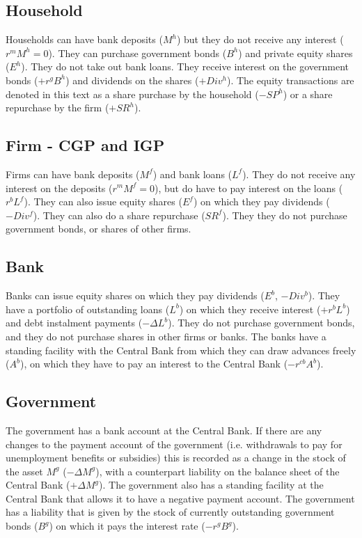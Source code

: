 \subsection{Household}
Households can have bank deposits ($M^h$) but they do not receive any interest ($r^{m} M^h=0$).
They can purchase government bonds ($B^h$) and private equity shares ($E^h$). They do not take out bank loans. They receive interest on the government bonds ($+r^gB^h$) and dividends on the shares ($+Div^h$). The equity transactions are denoted in this text as a share purchase by the household ($-SP^h$) or a share repurchase by the firm ($+SR^h$).

\subsection{Firm - CGP and IGP}
Firms can have bank deposits ($M^f$) and bank loans ($L^f$). They do not receive any interest on the deposits ($r^{m} M^f=0$), but do have to pay interest on the loans ($r^b L^f$). They can also issue equity shares ($E^f$) on which they pay dividends ($-Div^f$). They can also do a share repurchase ($SR^f$). They they do not purchase government bonds, or shares of other firms.

\subsection{Bank}
Banks can issue equity shares on which they pay dividends ($E^b$, $-Div^b$). They have a portfolio of outstanding loans ($L^b$) on which they receive interest ($+r^b L^b$) and debt instalment payments ($-\Delta L^b$).
They do not purchase government bonds, and they do not purchase shares in other firms or banks. The banks have a standing facility with the Central Bank from which they can draw advances freely ($A^b$), on which they have to pay an interest to the Central Bank ($-r^{cb}A^b$).

\subsection{Government}
The government has a bank account at the Central Bank. If there are any changes to the payment account of the government (i.e. withdrawals to pay for unemployment benefits or subsidies) this is recorded as a change in the stock of the asset $M^{g}$ ($-\Delta M^{g}$), with a counterpart liability on the balance sheet of the Central Bank ($+\Delta M^{g}$). The government also has a standing facility at the Central Bank that allows it to have a negative payment account. The government has a liability that is given by the stock of currently outstanding government bonds ($B^g$) on which it pays the interest rate ($-r^g B^g$).

